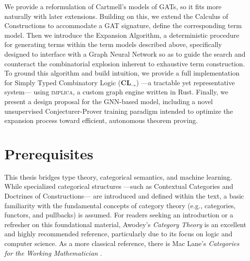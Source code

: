 We provide a reformulation of Cartmell's models of GATs, so it fits more naturally with later extensions.
Building on this, we extend the Calculus of Constructions to accommodate a GAT signature, 
define the corresponding term model.
Then we introduce the Expansion Algorithm, a deterministic procedure for generating terms within the term models described above, 
specifically designed to interface with a Graph Neural Network so as to guide the search and counteract the combinatorial 
explosion inherent to exhaustive term construction. 
To ground this algorithm and build intuition, we provide a full implementation for Simply Typed Combinatory Logic ($\textbf{CL}_{\to}$)
---a tractable yet representative system--- using \textsc{implica}, a custom graph engine written in Rust. 
Finally, we present a design proposal for the GNN-based model, including a novel unsupervised Conjecturer-Prover training paradigm intended to optimize 
the expansion process toward efficient, autonomous theorem proving.

\section*{Prerequisites}

This thesis bridges type theory, categorical semantics, and machine learning. 
While specialized categorical structures ---such as Contextual Categories and Doctrines of Constructions--- are introduced and defined within the text, 
a basic familiarity with the fundamental concepts of category theory (e.g., categories, functors, and pullbacks) is assumed. 
For readers seeking an introduction or a refresher on this foundational material, Awodey's \textit{Category Theory} \cite{awodey2010} is an excellent and highly recommended reference, 
particularly due to its focus on logic and computer science. 
As a more classical reference, there is Mac Lane's \textit{Categories for the Working Mathematician} \cite{maclane1992}.

